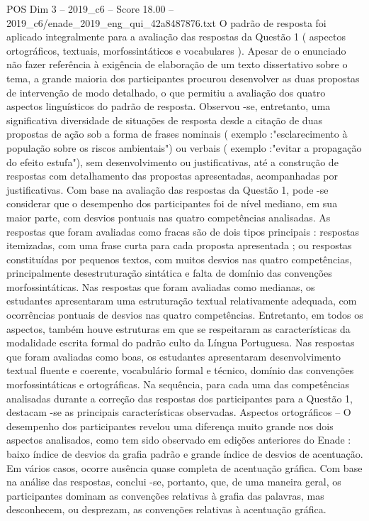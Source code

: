 \begin{textsample}{POS Dim 3 – 2019\_c6 – Score 18.00 – 2019\_c6/enade\_2019\_eng\_qui\_42a8487876.txt}
O padrão de resposta foi aplicado integralmente para a avaliação das respostas da Questão 1 ( aspectos ortográficos, textuais, morfossintáticos e vocabulares ).
Apesar de o enunciado não fazer referência à exigência de elaboração de um texto dissertativo sobre o tema, a grande maioria dos participantes procurou desenvolver as duas propostas de intervenção de modo detalhado, o que permitiu a avaliação dos quatro aspectos linguísticos do padrão de resposta.
Observou -se, entretanto, uma significativa diversidade de situações de resposta desde a citação de duas propostas de ação sob a forma de frases nominais ( exemplo :"esclarecimento à população sobre os riscos ambientais") ou verbais ( exemplo :"evitar a propagação do efeito estufa"), sem desenvolvimento ou justificativas, até a construção de respostas com detalhamento das propostas apresentadas, acompanhadas por justificativas.
Com base na avaliação das respostas da Questão 1, pode -se considerar que o desempenho dos participantes foi de nível mediano, em sua maior parte, com desvios pontuais nas quatro competências analisadas.
As respostas que foram avaliadas como fracas são de dois tipos principais : respostas itemizadas, com uma frase curta para cada proposta apresentada ; ou respostas constituídas por pequenos textos, com muitos desvios nas quatro competências, principalmente desestruturação sintática e falta de domínio das convenções morfossintáticas.
Nas respostas que foram avaliadas como medianas, os estudantes apresentaram uma estruturação textual relativamente adequada, com ocorrências pontuais de desvios nas quatro competências.
Entretanto, em todos os aspectos, também houve estruturas em que se respeitaram as características da modalidade escrita formal do padrão culto da Língua Portuguesa.
Nas respostas que foram avaliadas como boas, os estudantes apresentaram desenvolvimento textual fluente e coerente, vocabulário formal e técnico, domínio das convenções morfossintáticas e ortográficas.
Na sequência, para cada uma das competências analisadas durante a correção das respostas dos participantes para a Questão 1, destacam -se as principais características observadas.
Aspectos ortográficos – O desempenho dos participantes revelou uma diferença muito grande nos dois aspectos analisados, como tem sido observado em edições anteriores do Enade : baixo índice de desvios da grafia padrão e grande índice de desvios de acentuação.
Em vários casos, ocorre ausência quase completa de acentuação gráfica.
Com base na análise das respostas, conclui -se, portanto, que, de uma maneira geral, os participantes dominam as convenções relativas à grafia das palavras, mas desconhecem, ou desprezam, as convenções relativas à acentuação gráfica.

\end{textsample}
